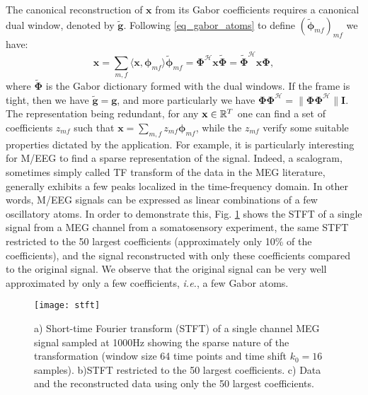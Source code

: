 The canonical reconstruction of $\mathbf{x}$ from its Gabor coefficients requires a canonical dual window, denoted by $\mathbf{\tilde{g}}$. Following \ref{eq_gabor_atoms} to define $(\tilde{\mathbf{\phi}}_{mf})_{mf}$ we have:
\begin{equation} \label{eq_TF_recons}
	\mathbf{x}=\sum_{m,f}\langle\mathbf{x}, \mathbf{\phi}_{mf}\rangle\tilde{\mathbf{\phi}}_{mf}=\mathbf{\Phi}^{\mathcal{H}}\mathbf{x\tilde{\Phi}}=\tilde{\mathbf{\Phi}}^{\mathcal{H}}\mathbf{x\Phi},
\end{equation}
where $\tilde{\mathbf{\Phi}}$ is the Gabor dictionary formed with the dual windows. If the frame is tight, then we have $\tilde{\mathbf{g}}=\mathbf{g}$, and more particularly we have $\mathbf{\Phi\Phi}^{\mathcal{H}}=\|\mathbf{\Phi\Phi}^{\mathcal{H}}\|\mathbf{I}$. The representation being redundant, for any $\mathbf{x}\in\mathbb{R}^T$ one can find a set of coefficients $z_{mf}$ such that $\mathbf{x}=\sum_{m,f}z_{mf}\mathbf{\phi}_{mf}$, while the $z_{mf}$ verify some suitable properties dictated by the application. For example, it is particularly interesting for M/EEG to find a sparse representation of the signal. Indeed, a scalogram, sometimes simply called TF transform of the data in the MEG literature, generally exhibits a few peaks localized in the time-frequency domain. In other words, M/EEG signals can be expressed as linear combinations of a few oscillatory atoms. In order to demonstrate this, Fig. \ref{fig:stft} shows the STFT of a single signal from a MEG channel from a somatosensory experiment, the same STFT restricted to the 50 largest coefficients (approximately only 10\% of the coefficients), and the signal reconstructed with only these coefficients compared to the original signal. We observe that the original signal can be very well approximated by only a few coefficients, \textit{i.e.}, a few Gabor atoms.

\begin{figure}
\centering
	\texttt{[image: stft]}
    \caption{a) Short-time Fourier transform (STFT) of a single channel MEG signal sampled at 1000Hz showing the sparse nature of the transformation (window size 64 time points and time shift $k_0=16$ samples). b)STFT restricted to the 50 largest coefficients. c) Data and the reconstructed data using only the 50 largest coefficients.}
	\label{fig:stft}
\end{figure}

